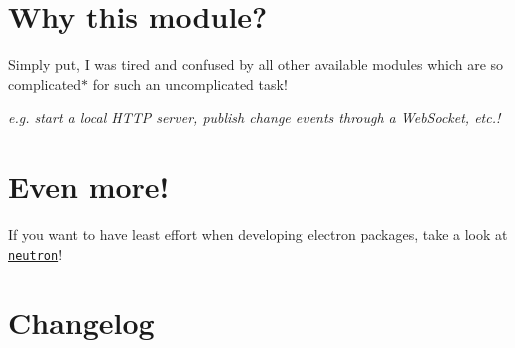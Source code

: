 \section*{Why this module?}

Simply put, I was tired and confused by all other available modules which are so complicated$\ast$ for such an uncomplicated task!


\begin{DoxyItemize}
\item {\itshape e.\+g. start a local H\+T\+TP server, publish change events through a Web\+Socket, etc.!}
\end{DoxyItemize}

\section*{Even more!}

If you want to have least effort when developing electron packages, take a look at \href{https://github.com/yan-foto/neutron}{\tt neutron}!

\section*{Changelog}



